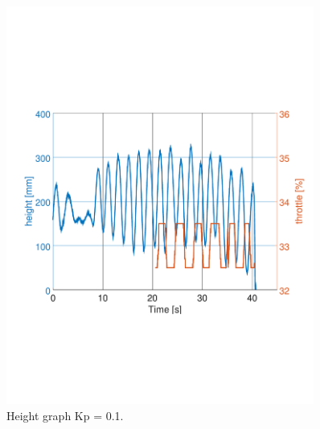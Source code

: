 \begin{figure}[h]
    \centering
    \includegraphics[width=0.9\textwidth, trim={0 7cm 0 7cm},clip]{figures/Appendix/final_test/kp0,1.pdf}
    \caption{Height graph Kp = 0.1.}
    \label{fig:third_test}
\end{figure}

